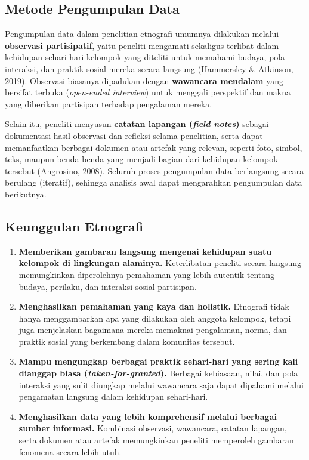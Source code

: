 \documentclass[
  indonesian,
  letterpaper,
  DIV=11,
  numbers=noendperiod]{scrreprt}
\providecommand{\tightlist}{%
  \setlength{\itemsep}{0pt}\setlength{\parskip}{0pt}}
\begin{document}
\subsection{Metode Pengumpulan Data}\label{metode-pengumpulan-data-1}

Pengumpulan data dalam penelitian etnografi umumnya dilakukan melalui
\textbf{observasi partisipatif}, yaitu peneliti mengamati sekaligus
terlibat dalam kehidupan sehari-hari kelompok yang diteliti untuk
memahami budaya, pola interaksi, dan praktik sosial mereka secara
langsung (Hammersley \& Atkinson, 2019). Observasi biasanya dipadukan
dengan \textbf{wawancara mendalam} yang bersifat terbuka
(\emph{open-ended interview}) untuk menggali perspektif dan makna yang
diberikan partisipan terhadap pengalaman mereka.

Selain itu, peneliti menyusun \textbf{catatan lapangan (\emph{field
notes})} sebagai dokumentasi hasil observasi dan refleksi selama
penelitian, serta dapat memanfaatkan berbagai dokumen atau artefak yang
relevan, seperti foto, simbol, teks, maupun benda-benda yang menjadi
bagian dari kehidupan kelompok tersebut (Angrosino, 2008). Seluruh
proses pengumpulan data berlangsung secara berulang (iteratif), sehingga
analisis awal dapat mengarahkan pengumpulan data berikutnya.

\subsection{Keunggulan Etnografi}\label{keunggulan-etnografi}

\begin{enumerate}
\def\labelenumi{\arabic{enumi}.}
\tightlist
\item
  \textbf{Memberikan gambaran langsung mengenai kehidupan suatu kelompok
  di lingkungan alaminya.} Keterlibatan peneliti secara langsung
  memungkinkan diperolehnya pemahaman yang lebih autentik tentang
  budaya, perilaku, dan interaksi sosial partisipan.
\item
  \textbf{Menghasilkan pemahaman yang kaya dan holistik.} Etnografi
  tidak hanya menggambarkan apa yang dilakukan oleh anggota kelompok,
  tetapi juga menjelaskan bagaimana mereka memaknai pengalaman, norma,
  dan praktik sosial yang berkembang dalam komunitas tersebut.
\item
  \textbf{Mampu mengungkap berbagai praktik sehari-hari yang sering kali
  dianggap biasa (\emph{taken-for-granted}).} Berbagai kebiasaan, nilai,
  dan pola interaksi yang sulit diungkap melalui wawancara saja dapat
  dipahami melalui pengamatan langsung dalam kehidupan sehari-hari.
\item
  \textbf{Menghasilkan data yang lebih komprehensif melalui berbagai
  sumber informasi.} Kombinasi observasi, wawancara, catatan lapangan,
  serta dokumen atau artefak memungkinkan peneliti memperoleh gambaran
  fenomena secara lebih utuh.
\end{enumerate}
\end{document}
